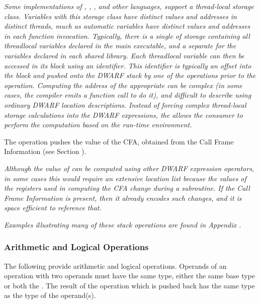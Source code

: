 \begin{enumerate}[1. ]
\textit{Some implementations of 
, , , and other 
languages, support a 
thread-local storage class. Variables with this storage class
have distinct values and addresses in distinct threads, much
as automatic variables have distinct values and addresses in
each function invocation. Typically, there is a single 
of storage containing all thread\dash local variables declared in
the main executable, and a separate  for the variables
declared in each shared library. Each 
thread\dash local variable can then be accessed in its block using an
identifier. This identifier is typically an offset into the block and 
pushed onto the DWARF stack by one of the 
\DWOPconstnx{} operations prior to the
\DWOPformtlsaddress{} operation. 
Computing the address of
the appropriate  can be complex (in some cases, the
compiler emits a function call to do it), and difficult
to describe using ordinary DWARF location descriptions.
Instead of    forcing complex thread-local storage calculations into 
the DWARF expressions, the \DWOPformtlsaddress{} allows the consumer 
to perform the computation based on the run-time environment.}

\itembfnl{\DWOPcallframecfaTARG}
The \DWOPcallframecfaNAME{} 
operation pushes the value of the
CFA, obtained from the Call Frame Information 
(see Section ).

\textit{Although the value of \DWATframebase{}
can be computed using other DWARF expression operators,
in some cases this would require an extensive location list
because the values of the registers used in computing the
CFA change during a subroutine. If the 
Call Frame Information 
is present, then it already encodes such changes, and it is
space efficient to reference that.}
\end{enumerate}

\textit{Examples illustrating many of these stack operations are
found in Appendix .}

\subsubsection{Arithmetic and Logical Operations} 
The following provide arithmetic and logical operations. 
\bb
Operands of an operation with two operands
\eb
must have the same type,
either the same base type or both the \specialaddresstype.
The result of the operation which is pushed back has the same type
as the type of the operand(s).  

